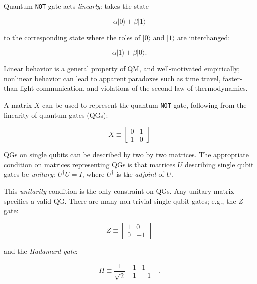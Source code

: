 \documentclass{article}
\numberwithin{equation}{section}
\newcommand{\bracket}[1]{|#1\rangle}
\begin{document}
Quantum \texttt{NOT} gate acts \textit{linearly}: takes the state

\begin{equation} \label{eq:1.8}
\alpha \bracket{0} + \beta \bracket{1}
\end{equation}

to the corresponding state where the roles of $\bracket{0}$ and $\bracket{1}$ are interchanged:

\begin{equation} \label{eq:1.9}
\alpha \bracket{1} + \beta \bracket{0}.
\end{equation}

Linear behavior is a general property of QM, and well-motivated empirically; nonlinear behavior can lead to apparent paradoxes such as time travel, faster-than-light communication, and violations of the second law of thermodynamics.

A matrix $X$ can be used to represent the quantum \texttt{NOT} gate, following from the linearity of quantum gates (QGs):

\begin{equation} \label{eq:1.10}
X \equiv \left [ \begin{smallmatrix} 0 & 1 \\ 1 & 0 \end{smallmatrix} \right ]
\end{equation}

QGs on single qubits can be described by two by two matrices. The appropriate condition on matrices representing QGs is that matrices $U$ describing single qubit gates be \textit{unitary}: $U^\dagger U = I$, where $U^\dagger$ is the \textit{adjoint} of $U$.

This \textit{unitarity} condition is the only constraint on QGs. Any unitary matrix specifies a valid QG. There are many non-trivial single qubit gates; e.g., the $Z$ gate:

\begin{equation} \label{eq:1.13}
Z \equiv \left [ \begin{smallmatrix} 1 & 0 \\ 0 & -1 \end{smallmatrix} \right ]
\end{equation}

and the \textit{Hadamard gate}:

\begin{equation} \label{eq:1.14}
H \equiv \frac{1}{\sqrt{2}} \left [ \begin{smallmatrix} 1 & 1 \\ 1 & -1 \end{smallmatrix} \right ].
\end{equation}
\end{document}
